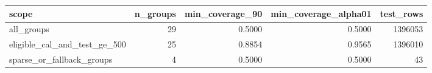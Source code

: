 \begin{tabular}{lrrrr}
\toprule
scope & n\_groups & min\_coverage\_90 & min\_coverage\_alpha01 & test\_rows \\
\midrule
all\_groups & 29 & 0.5000 & 0.5000 & 1396053 \\
eligible\_cal\_and\_test\_ge\_500 & 25 & 0.8854 & 0.9565 & 1396010 \\
sparse\_or\_fallback\_groups & 4 & 0.5000 & 0.5000 & 43 \\
\bottomrule
\end{tabular}
